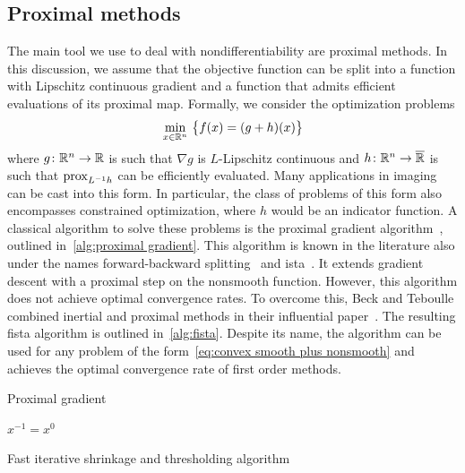 \subsection{Proximal methods}
The main tool we use to deal with nondifferentiability are proximal methods.
In this discussion, we assume that the objective function can be split into a function with Lipschitz continuous gradient and a function that admits efficient evaluations of its proximal map.
Formally, we consider the optimization problems
\begin{equation}
	\min_{x\in \R^n}\ \bigl\{ f(x) = (g + h)(x) \bigr\}%
	\label{eq:convex smooth plus nonsmooth}
\end{equation}
where \( g \colon \mathbb{R}^n \to \mathbb{R} \) is such that \( \nabla g \) is \( L \)-Lipschitz continuous and \( h \colon \mathbb{R}^n \to \overline{\mathbb{R}} \) is such that \( \operatorname{prox}_{L^{-1} h} \) can be efficiently evaluated.
Many applications in imaging can be cast into this form.
In particular, the class of problems of this form also encompasses constrained optimization, where \( h \) would be an indicator function.
A classical algorithm to solve these problems is the proximal gradient algorithm~\cite[chapter 10]{beck_firstorder_2017}, outlined in~\cref{alg:proximal gradient}.
This algorithm is known in the literature also under the names forward-backward splitting~\cite{lions_splitting_1979,combettes_forwardbackward_2005} and \gls{ista}~\cite{Daubechies2004}.
It extends gradient descent with a proximal step on the nonsmooth function.
However, this algorithm does not achieve optimal convergence rates.
To overcome this, Beck and Teboulle combined inertial and proximal methods in their influential paper~\cite{beck_fista_2009}.
The resulting \gls{fista} algorithm is outlined in~\cref{alg:fista}.
Despite its name, the algorithm can be used for any problem of the form~\cref{eq:convex smooth plus nonsmooth} and achieves the optimal convergence rate of first order methods.
\begin{algorithm}
	\DontPrintSemicolon
	\caption{Proximal gradient}
	\label{alg:proximal gradient}
\end{algorithm}
\begin{algorithm}
	\DontPrintSemicolon
	\( x^{\num{-1}} = x^{\num{0}} \)\;
	\caption{Fast iterative shrinkage and thresholding algorithm~\cite{beck_fista_2009}}
	\label{alg:fista}
\end{algorithm}
